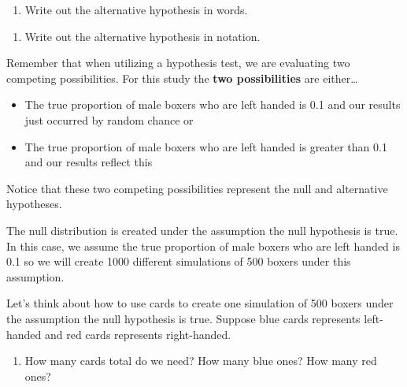 \documentclass[
]{report}
\providecommand{\tightlist}{%
  \setlength{\itemsep}{0pt}\setlength{\parskip}{0pt}}
\begin{document}
\vspace{0.5in}

\begin{enumerate}
\def\labelenumi{\arabic{enumi}.}
\setcounter{enumi}{12}
\tightlist
\item
  Write out the alternative hypothesis in words.
\end{enumerate}

\vspace{1in}

\begin{enumerate}
\def\labelenumi{\arabic{enumi}.}
\setcounter{enumi}{13}
\tightlist
\item
  Write out the alternative hypothesis in notation.
\end{enumerate}

\vspace{0.5in}

Remember that when utilizing a hypothesis test, we are evaluating two competing possibilities. For this study the \textbf{two possibilities} are either\ldots{}

\begin{itemize}
\item
  The true proportion of male boxers who are left handed is 0.1 and our results just occurred by random chance or
\item
  The true proportion of male boxers who are left handed is greater than 0.1 and our results reflect this
\end{itemize}

Notice that these two competing possibilities represent the null and alternative hypotheses.

The null distribution is created under the assumption the null hypothesis is true. In this case, we assume the true proportion of male boxers who are left handed is 0.1 so we will create 1000 different simulations of 500 boxers under this assumption.

Let's think about how to use cards to create one simulation of 500 boxers under the assumption the null hypothesis is true. Suppose blue cards represents left-handed and red cards represents right-handed.

\begin{enumerate}
\def\labelenumi{\arabic{enumi}.}
\setcounter{enumi}{14}
\tightlist
\item
  How many cards total do we need? How many blue ones? How many red ones?
\end{enumerate}
\end{document}
